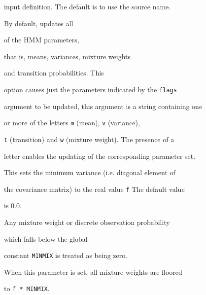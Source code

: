 \begin{optlist}
      input definition.  The default is to use the source name.





    By default,  updates all 


      of the HMM parameters,


      that is, means, variances, mixture weights


      and transition probabilities. This 


      option causes just the parameters indicated by the {\tt flags}


      argument to be updated, this argument is a string containing one


      or more of the letters {\tt m} (mean), {\tt v} (variance), 


      {\tt t} (transition) and {\tt w} (mixture weight).  The presence of a


      letter enables the updating of the corresponding parameter set.





    This sets the minimum variance (i.e. diagonal element of


      the covariance matrix) to the real value {\tt f} The default value


      is 0.0.





    Any mixture weight  or discrete observation probability


      which falls below the global


            constant {\tt MINMIX} is treated as being zero.


      When this parameter is  set,  all mixture weights  are floored


      to {\tt f * MINMIX}.





\stdoptB


\stdoptF


\stdoptG


\stdoptH


\stdoptI


\stdoptL


\stdoptM


\stdoptX





\end{optlist}


